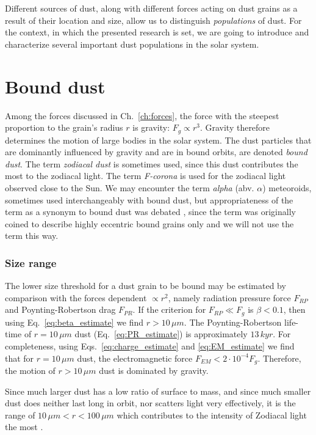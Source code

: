 Different sources of dust, along with different forces acting on dust grains as a result of their location and size, allow us to distinguish \textit{populations} of dust. For the context, in which the presented research is set, we are going to introduce and characterize several important dust populations in the solar system.

\section{Bound dust}

Among the forces discussed in Ch.~\ref{ch:forces}, the force with the steepest proportion to the grain's radius $r$ is gravity: $F_g \propto r^3$. Gravity therefore determines the motion of large bodies in the solar system. The dust particles that are dominantly influenced by gravity and are in bound orbits, are denoted \textit{bound dust}. The term \textit{zodiacal dust} is sometimes used, since this dust contributes the most to the zodiacal light. The term \textit{F-corona} is used for the zodiacal light observed close to the Sun. We may encounter the term \textit{alpha} (abv. $\alpha$) meteoroids, sometimes used interchangeably with bound dust, but appropriateness of the term as a synonym to bound dust was debated \citep{sommer2023alpha}, since the term was originally coined to describe highly eccentric bound grains only \citep{zook1975source} and we will not use the term this way.

\subsubsection{Size range}

The lower size threshold for a dust grain to be bound may be estimated by comparison with the forces dependent $\propto r^2$, namely radiation pressure force $F_{RP}$ and Poynting-Robertson drag $F_{PR}$. If the criterion for $F_{RP} \ll F_g$ is $\beta<0.1$, then using Eq.~\ref{eq:beta_estimate} we find $r>10 \, \si{\mu m}$. The Poynting-Robertson life-time of $r=10 \, \si{\mu m}$ dust (Eq.~\ref{eq:PR_estimate}) is approximately $13 \, \si{kyr}$. For completeness, using Eqs.~\ref{eq:charge_estimate} and \ref{eq:EM_estimate} we find that for $r=10 \, \si{\mu m}$ dust, the electromagnetic force $F_{EM} < 2\cdot 10^{-4} F_g$. Therefore, the motion of $r>10 \, \si{\mu m}$ dust is dominated by gravity.

Since much larger dust has a low ratio of surface to mass, and since much smaller dust does neither last long in orbit, nor scatters light very effectively, it is the range of $10 \, \si{\mu m} < r < 100 \, \si{\mu m}$ which contributes to the intensity of Zodiacal light the most \citep{leinert1981zodiacal}. 

